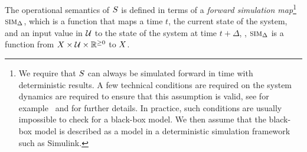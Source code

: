 The operational semantics of $S$ is defined in terms of a {\em
forward simulation map}\footnote{We require that $S$ can always
be simulated forward in time with deterministic results. A few
technical conditions are required on the system dynamics are required
to ensure that this assumption is valid, see for
example~\cite{Meiss/2007/Differential} and \cite{goebel2012hybrid} for
further details. In practice, such conditions are usually impossible
to check for a black-box model. We then assume that the black-box
model is described as a model in a deterministic simulation framework
such as Simulink\textregistered.} $\mbox{\sc sim}_\Delta$, which is a
function that maps a time $t$, the current state of the system, and an
input value in $\mathcal{U}$ to the state of the system at time
$t+\Delta$, \ie, $\mbox{\sc sim}_\Delta$ is a function from $X
\times \mathcal{U} \times \mathbb{R}^{\ge 0}$ to $X$. 

% 

% 



